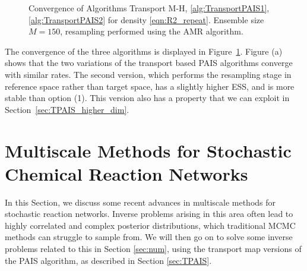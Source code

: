 \documentclass[final]{siamltex}
\begin{document}
\begin{figure}[!ht]
\centering
{}
\caption{Convergence of Algorithms Transport M-H,
  \ref{alg:TransportPAIS1}, \ref{alg:TransportPAIS2} for density \eqref{eqn:R2_repeat}. Ensemble size $M=150$, resampling performed using the AMR algorithm.}
\label{fig:R2_l2_convergence}
\end{figure}

The convergence of the three algorithms is displayed in Figure~\ref{fig:R2_l2_convergence}. Figure (a) shows that the two variations of the transport based PAIS algorithms converge with similar rates. The second version, which performs the resampling stage in reference space rather than target space, has a slightly higher ESS, and is more stable than option (1). This version also has a property that we can exploit in Section~\ref{sec:TPAIS_higher_dim}.



\section{Multiscale Methods for Stochastic Chemical Reaction
  Networks}\label{sec:multi}
In this Section, we discuss some recent advances in multiscale methods
for stochastic reaction networks. Inverse problems arising in this
area often lead to highly correlated and complex posterior
distributions, which traditional MCMC methods can struggle to sample
from. We will then go on to solve some inverse problems related to
this in Section \ref{sec:num}, using the transport map versions of the
PAIS algorithm, as described in Section \ref{sec:TPAIS}.
\end{document}
